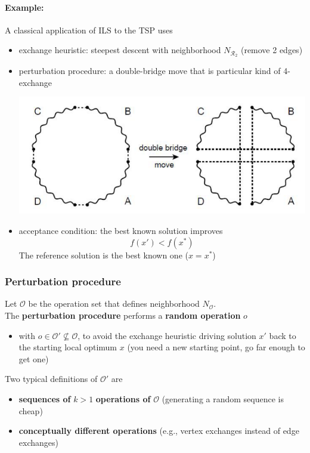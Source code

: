 \vfill

\paragraph{Example:} A classical application of ILS to the TSP uses
\begin{itemize}
	\item exchange heuristic: steepest descent with neighborhood $N_{\mathcal{R}_2}$ (remove 2 edges)
	
	\item perturbation procedure: a double-bridge move that is particular kind of 4-exchange
	\begin{center}
		\includegraphics[width=0.6\columnwidth]{img/TSP5}
	\end{center}
	
	\item acceptance condition: the best known solution improves 
	$$f (x') < f (x^\ast)$$
	The reference solution is the best known one ($x = x^\ast$)
\end{itemize}

\newpage

\subsubsection{Perturbation procedure}

Let $\mathcal{O}$ be the operation set that defines neighborhood $N_{\mathcal{O}}$.\\

The \textbf{perturbation procedure} performs a \textbf{random operation} $o$
\begin{itemize}
	\item with $o \in \mathcal{O}' \not \subseteq \mathcal{O}$, to avoid the exchange heuristic driving solution $x'$ back to the starting local optimum $x$ (you need a new starting point, go far enough to get one)
\end{itemize}

Two typical definitions of $\mathcal{O}'$ are
\begin{itemize}
	\item \textbf{sequences of} $k > 1$ \textbf{operations of} $\mathcal{O}$ (generating a random sequence is cheap)
	
	\item \textbf{conceptually different operations} (e.g., vertex exchanges instead of edge exchanges)
\end{itemize}

